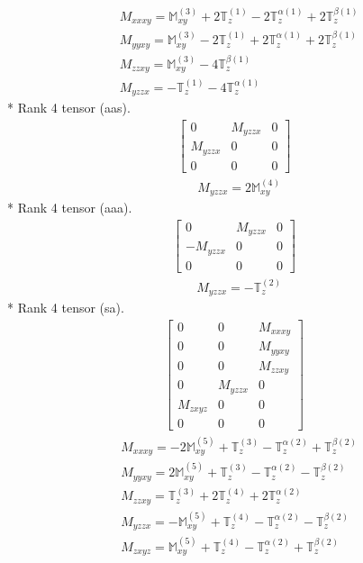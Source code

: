 \documentclass[fleqn,8pt,landscape]{jsarticle}
\begin{document}
\begin{align*}
& M_{xxxy} = \mathbb{M}_{xy}^{(3)} + 2 \mathbb{T}_{z}^{(1)} - 2 \mathbb{T}_{z}^{\alpha(1)} + 2 \mathbb{T}_{z}^{\beta(1)} \\
& M_{yyxy} = \mathbb{M}_{xy}^{(3)} - 2 \mathbb{T}_{z}^{(1)} + 2 \mathbb{T}_{z}^{\alpha(1)} + 2 \mathbb{T}_{z}^{\beta(1)} \\
& M_{zzxy} = \mathbb{M}_{xy}^{(3)} - 4 \mathbb{T}_{z}^{\beta(1)} \\
& M_{yzzx} = - \mathbb{T}_{z}^{(1)} - 4 \mathbb{T}_{z}^{\alpha(1)}
\end{align*}
* Rank 4 tensor (aas).
\begin{align*}
\begin{bmatrix} 0 & M_{yzzx} & 0 \\ M_{yzzx} & 0 & 0 \\ 0 & 0 & 0 \end{bmatrix}
\end{align*}
\begin{align*}
& M_{yzzx} = 2 \mathbb{M}_{xy}^{(4)}
\end{align*}
* Rank 4 tensor (aaa).
\begin{align*}
\begin{bmatrix} 0 & M_{yzzx} & 0 \\ - M_{yzzx} & 0 & 0 \\ 0 & 0 & 0 \end{bmatrix}
\end{align*}
\begin{align*}
& M_{yzzx} = - \mathbb{T}_{z}^{(2)}
\end{align*}
* Rank 4 tensor (sa).
\begin{align*}
\begin{bmatrix} 0 & 0 & M_{xxxy} \\ 0 & 0 & M_{yyxy} \\ 0 & 0 & M_{zzxy} \\ 0 & M_{yzzx} & 0 \\ M_{zxyz} & 0 & 0 \\ 0 & 0 & 0 \end{bmatrix}
\end{align*}
\begin{align*}
& M_{xxxy} = - 2 \mathbb{M}_{xy}^{(5)} + \mathbb{T}_{z}^{(3)} - \mathbb{T}_{z}^{\alpha(2)} + \mathbb{T}_{z}^{\beta(2)} \\
& M_{yyxy} = 2 \mathbb{M}_{xy}^{(5)} + \mathbb{T}_{z}^{(3)} - \mathbb{T}_{z}^{\alpha(2)} - \mathbb{T}_{z}^{\beta(2)} \\
& M_{zzxy} = \mathbb{T}_{z}^{(3)} + 2 \mathbb{T}_{z}^{(4)} + 2 \mathbb{T}_{z}^{\alpha(2)} \\
& M_{yzzx} = - \mathbb{M}_{xy}^{(5)} + \mathbb{T}_{z}^{(4)} - \mathbb{T}_{z}^{\alpha(2)} - \mathbb{T}_{z}^{\beta(2)} \\
& M_{zxyz} = \mathbb{M}_{xy}^{(5)} + \mathbb{T}_{z}^{(4)} - \mathbb{T}_{z}^{\alpha(2)} + \mathbb{T}_{z}^{\beta(2)}
\end{align*}
\end{document}
